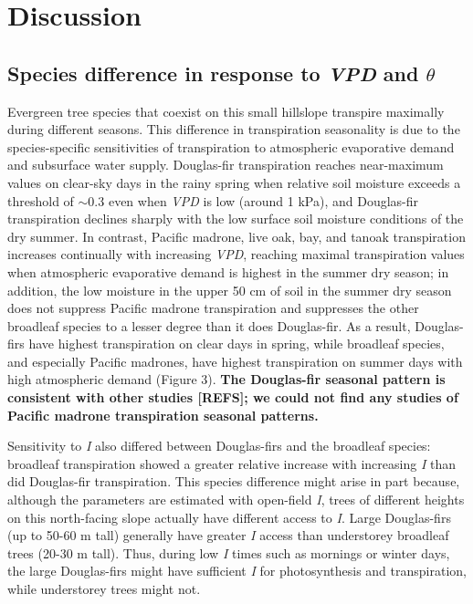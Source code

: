 \section{Discussion}

\subsection{Species difference in response to \textit{VPD} and $\theta$}
Evergreen tree species that coexist on this small hillslope transpire maximally during different seasons.  This difference in transpiration seasonality is due to the species-specific sensitivities of transpiration to atmospheric evaporative demand and subsurface water supply.  Douglas-fir transpiration reaches near-maximum values on clear-sky days in the rainy spring when relative soil moisture exceeds a threshold of $\sim$0.3 even when \textit{VPD} is low (around 1 kPa), and Douglas-fir transpiration declines sharply with the low surface soil moisture conditions of the dry summer.  In contrast, Pacific madrone, live oak, bay, and tanoak transpiration increases continually with increasing \textit{VPD}, reaching maximal transpiration values when atmospheric evaporative demand is highest in the summer dry season; in addition, the low moisture in the upper 50 cm of soil in the summer dry season does not suppress Pacific madrone transpiration and suppresses the other broadleaf species to a lesser degree than it does Douglas-fir.  As a result, Douglas-firs have highest transpiration on clear days in spring, while broadleaf species, and especially Pacific madrones, have highest transpiration on summer days with high atmospheric demand (Figure 3).  \textbf{The Douglas-fir seasonal pattern is consistent with other studies [REFS]; we could not find any studies of Pacific madrone transpiration seasonal patterns.}

Sensitivity to \textit{I} also differed between Douglas-firs and the broadleaf species: broadleaf transpiration showed a greater relative increase with increasing \textit{I} than did Douglas-fir transpiration. This species difference might arise in part because, although the parameters are estimated with open-field \textit{I}, trees of different heights on this north-facing slope actually have different access to \textit{I}. Large Douglas-firs (up to 50-60 m tall) generally have greater \textit{I} access than understorey broadleaf trees (20-30 m tall).  Thus, during low \textit{I} times such as mornings or winter days, the large Douglas-firs might have sufficient \textit{I} for photosynthesis and transpiration, while understorey trees might not.


